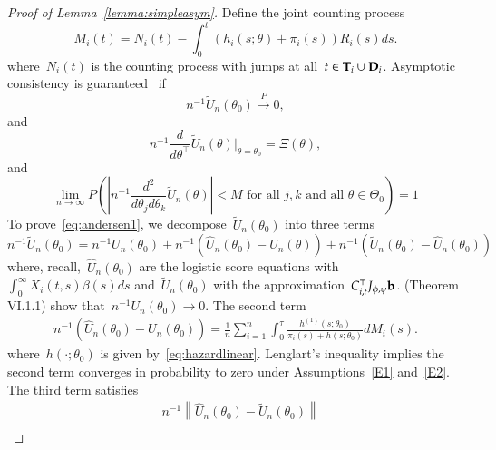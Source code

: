 \documentclass[11pt]{amsart}
\def\bfT{{\bf T}}
\def\bfD{{\bf D}}
\begin{document}
\begin{proof}[Proof of Lemma~\ref{lemma:simpleasym}]
Define the joint counting process
\[
M_i (t) = N_i (t) - \int_0^t (h_i (s; \theta) + \pi_i (s)) R_i (s) ds.
\]
where~$N_i (t)$ is the counting process with jumps at all~$t \in \bfT_i \cup \bfD_i$. Asymptotic consistency is guaranteed~\cite[Theorem VI.1.1]{Andersen1993} if
\begin{equation}
\label{eq:andersen1}
n^{-1} \tilde U_n (\theta_0 ) \overset{P}{\to} 0,
\end{equation}
and
\begin{equation}
\label{eq:andersen2}
n^{-1} \frac{d}{d \theta^{\top}} \tilde U_n (\theta) \big |_{\theta =
  \theta_0} = \Xi (\theta),
\end{equation}
and
\begin{equation}
\label{eq:andersen3}
\lim_{n \to \infty} P \left( \left | n^{-1} \frac{d^2}{d \theta_j d
      \theta_k} \tilde U_n (\theta) \right | < M \text{ for all }
  j,k \text{ and all } \theta \in \Theta_0 \right) = 1
\end{equation}
To prove~\eqref{eq:andersen1}, we decompose~$\tilde U_n (\theta_0)$ into
three terms
\begin{equation}
\label{eq:decomp}
n^{-1} \tilde U_n (\theta_0) = n^{-1} U_n (\theta_0 )  + n^{-1} \left(
  \hat U_n (\theta_0) - U_n (\theta) \right) + n^{-1} \left(\tilde U_n
  (\theta_0) - \hat U_n (\theta_0) \right)
\end{equation}
where, recall,~$\hat U_n (\theta_0)$ are the logistic score equations with $\int_0^\infty X_i(t,s) \beta(s) ds$ and~$\tilde U_n (\theta_0)$ with the approximation~$C_{i,t}^\top J_{\phi, \psi} {\bf b}$. \cite{Andersen1993} (Theorem VI.1.1) show that~$n^{-1} U_n (\theta_0)
\to 0$. The second term
\begin{align*}
n^{-1} \left( \hat U_n (\theta_0) - U_n (\theta_0) \right) =
  \frac{1}{n} \sum_{i=1}^n \int_0^{\tau} \frac{h^{(1)} (s;
  \theta_0)}{\pi_i (s) + h (s;\theta_0)} d M_i (s).
\end{align*}
where~$h(\cdot; \theta_0)$ is given by~\eqref{eq:hazardlinear}. Lenglart's inequality implies the second term converges in probability to zero under Assumptions~\ref{E1} and~\ref{E2}. The third term satisfies
\begin{align*}
  &n^{-1} \left \| \hat U_n (\theta_0) - \tilde U_n (\theta_0) \right \| \\

\end{align*}
\end{proof}
\end{document}
